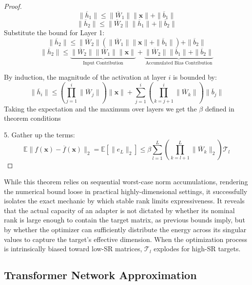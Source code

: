 \documentclass[a4paper,14pt]{extarticle}
\begin{document}
\begin{proof}
                $$ \| \overline{h}_1 \| \leqslant \| \overline{W}_1 \| \| \mathbf{x} \| + \| \overline{b}_1 \| $$
                $$ \| \overline{h}_2 \| \leqslant \| \overline{W}_2 \| \| \overline{h}_1 \| + \| \overline{b}_2 \| $$
                Substitute the bound for Layer 1:
                $$ \| \overline{h}_2 \| \leqslant \| \overline{W}_2 \| ( \| \overline{W}_1 \| \| \mathbf{x} \| + \| \overline{b}_1 \| ) + \| \overline{b}_2 \| $$
                $$ \| \overline{h}_2 \| \leqslant \underbrace{\| \overline{W}_2 \| \| \overline{W}_1 \| \| \mathbf{x} \|}_{\text{Input Contribution}} + \underbrace{\| \overline{W}_2 \| \| \overline{b}_1 \| + \| \overline{b}_2 \|}_{\text{Accumulated Bias Contribution}} $$
            
                By induction, the magnitude of the activation at layer $i$ is bounded by:
                $$ \| \overline{h}_i \| \leqslant \left( \prod_{j=1}^i \| \overline{W}_j \| \right) \| \mathbf{x} \| + \sum_{j=1}^i \left( \prod_{k=j+1}^i \| \overline{W}_k \| \right) \| \overline{b}_j \| $$
                Taking the expectation and the maximum over layers we get the $\beta$ defined in theorem conditions

        5.  Gather up the terms:
            $$ \mathbb{E} \| f(\mathbf{x}) - \overline{f}(\mathbf{x}) \|_2 = \mathbb{E}[\|e_L\|_2] \leqslant  \beta \sum_{l=1}^L \left( \prod_{k=l+1}^L \| \overline{W}_k \|_2 \right) \mathcal{T}_l $$

        \end{proof}

    While this theorem relies on sequential worst-case norm accumulations, rendering the numerical bound loose in practical highly-dimensional settings, it successfully isolates the exact mechanic by which stable rank limits expressiveness. It reveals that the actual capacity of an adapter is not dictated by whether its nominal rank is large enough to contain the target matrix, as previous bounds imply, but by whether the optimizer can sufficiently distribute the energy across its singular values to capture the target's effective dimension. When the optimization process is intrinsically biased toward low-SR matrices, $\mathcal{T}_l$ explodes for high-SR targets.


    \subsection{Transformer Network Approximation}
\end{document}
